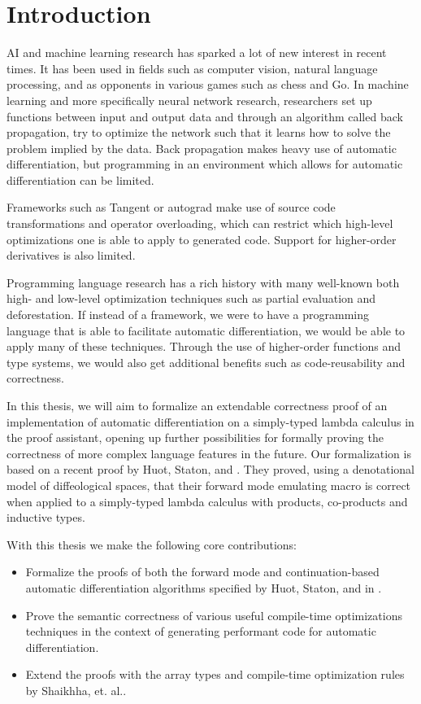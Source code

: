 \section{Introduction}
AI and machine learning research has sparked a lot of new interest in recent times. It has been used in fields such as computer vision, natural language processing, and as opponents in various games such as chess and Go.
In machine learning and more specifically neural network research, researchers set up functions between input and output data and through an algorithm called back propagation, try to optimize the network such that it learns how to solve the problem implied by the data.
Back propagation makes heavy use of automatic differentiation, but programming in an environment which allows for automatic differentiation can be limited.

Frameworks such as Tangent or autograd make use of source code transformations and operator overloading, which can restrict which high-level optimizations one is able to apply to generated code. Support for higher-order derivatives is also limited.

Programming language research has a rich history with many well-known both high- and low-level optimization techniques such as partial evaluation and deforestation.
If instead of a framework, we were to have a programming language that is able to facilitate automatic differentiation, we would be able to apply many of these techniques. Through the use of higher-order functions and type systems, we would also get additional benefits such as code-reusability and correctness.

In this thesis, we will aim to formalize an extendable correctness proof of an implementation of automatic differentiation on a simply-typed lambda calculus in the \Coq proof assistant, opening up further possibilities for formally proving the correctness of more complex language features in the future.
Our formalization is based on a recent proof by Huot, Staton, and \Vakar{} \cite{huot2020correctness}.
They proved, using a denotational model of diffeological spaces, that their forward mode emulating macro is correct when applied to a simply-typed lambda calculus with products, co-products and inductive types.

With this thesis we make the following core contributions:
\begin{itemize}
  \item Formalize the proofs of both the forward mode and continuation-based automatic differentiation algorithms specified by Huot, Staton, and \Vakar{} \cite{huot2020correctness} in \Coq.
  \item Prove the semantic correctness of various useful compile-time optimizations techniques in the context of generating performant code for automatic differentiation.
  \item Extend the proofs with the array types and compile-time optimization rules by Shaikhha, et. al.\cite{Shaikha2019}.
\end{itemize}

